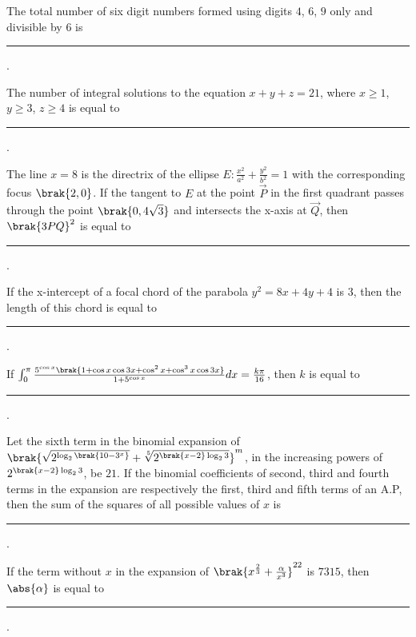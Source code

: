 \iffalse
\title{2023}
\author{EE24Btech11024}
\section{integer}
\fi

\item The total number of six digit numbers formed using digits $4$, $6$, $9$ only and divisible by $6$ is \rule{1cm}{0.15mm}.

\hfill{}

\item The number of integral solutions to the equation $x+y+z=21$, where $x\geq 1$, $y\geq 3$, $z\geq 4$ is equal to \rule{1cm}{0.15mm}.

\hfill{}

\item The line $x=8$ is the directrix of the ellipse $E:\frac{x^2}{a^2}+\frac{y^2}{b^2}=1$ with the corresponding focus $\brak{2,0}$. If the tangent to $E$ at the point $\vec{P}$ in the first quadrant passes through the point $\brak{0,4\sqrt{3}}$ and intersects the x-axis at $\vec{Q}$, then $\brak{3PQ}^2$ is equal to \rule{1cm}{0.15mm}.

\hfill{}

\item If the x-intercept of a focal chord of the parabola $y^2=8x+4y+4$ is 3, then the length of this chord is equal to \rule{1cm}{0.15mm}.

\hfill{}

\item If $\int_{0}^{\pi}\frac{5^{\cos x}\brak{1+\cos x\cos 3x+\cos^{2}x+\cos^{3}x\cos 3x}}{1+5^{\cos x}}dx=\frac{k\pi}{16}$, then $k$ is equal to \rule{1cm}{0.15mm}.

\hfill{}

\item Let the sixth term in the binomial expansion of $\brak{\sqrt{2^{\log_2{\brak{10-3^x}}}}+\sqrt[5]{2^{\brak{x-2}\log_2{3}}}}^m$, in the increasing powers of $2^{\brak{x-2}\log_2{3}}$, be $21$. If the binomial coefficients of second, third and fourth terms in the expansion are respectively the first, third and fifth terms of an A.P, then the sum of the squares of all possible values of $x$ is \rule{1cm}{0.15mm}.

\hfill{}

\item If the term without $x$ in the expansion of $\brak{x^{\frac{2}{3}}+\frac{\alpha}{x^3}}^{22}$ is $7315$, then $\abs{\alpha}$ is equal to \rule{1cm}{0.15mm}.

